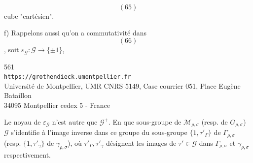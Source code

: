 \[
(65)
\]
cube "cartésien".

f) Rappelons aussi qu'on a commutativité dans
\[
(66)
\]
, soit \(\varepsilon_{\mathcal G}:\mathcal G\longrightarrow\{\pm1\}\),


{\small
\begin{center}
561\\
\texttt{https://grothendieck.umontpellier.fr}\\
Université de Montpellier, UMR CNRS 5149, Case courrier 051, Place Eugène Bataillon\\
34095 Montpellier cedex 5 - France
\end{center}
}


Le noyau de $\varepsilon_{\mathcal{G}}$ n'est autre que $\mathcal{G}^{+}$. En  que sous-groupe de $\mathcal M_{\rho,\sigma}$ (resp. de $G_{\rho,\sigma}$) $\mathcal{G}$ s'identifie à l'image inverse dans ce groupe du sous-groupe $\{1,\tau'_{\Gamma}\}$ de $\Gamma_{\rho,\sigma}$ (resp.  $\{1,\tau'_{\gamma}\}$ de $\gamma_{\rho,\sigma}$), où $\tau'_{\Gamma},\tau'_{\gamma}$ désignent les images de $\tau'\in\mathcal{G}$ dans $\Gamma_{\rho,\sigma}$ et $\gamma_{\rho,\sigma}$ respectivement.

